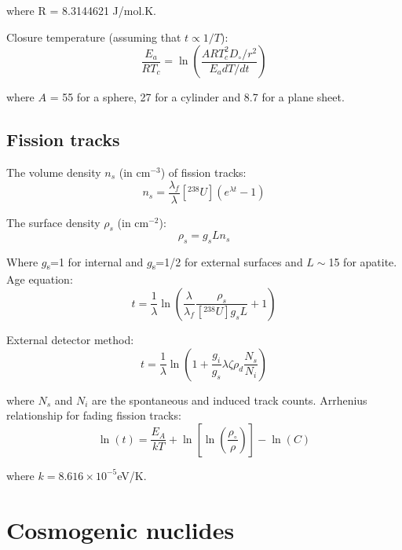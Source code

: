 \documentclass{article}
\begin{document}
\begin{multicols}{3}
where R = 8.3144621 J/mol.K.\medskip

Closure temperature (assuming that $t \propto 1/T$):
\begin{equation}
\frac{E_a}{RT_c} = \ln\left(\frac{ART_c^2D_\circ/r^2}{E_adT/dt}\right)
\label{eq:Tc}
\end{equation}

where $A$ = 55 for a sphere, 27 for a cylinder and 8.7 for a plane
sheet.

\subsection{Fission tracks}
\label{sec:fission-tracks}

The volume density $n_s$ (in cm$^{-3}$) of fission tracks:
\begin{equation}
n_{s} = \frac{\lambda_f}{\lambda} [^{238}U] \left(e^{\lambda t}-1\right)
\label{eq:Ns}
\end{equation}

The surface density $\rho_s$ (in cm$^{-2}$):
\begin{equation}
\rho_s = g_s L n_s
\label{eq:rhos}
\end{equation}

Where $g$\textsubscript{s}=1 for internal and $g$\textsubscript{s}=1/2
for external surfaces and $L\sim$15 for apatite. Age
equation:
\begin{equation}
t = \frac{1}{\lambda}
\ln\left(\frac{\lambda}{\lambda_f}\frac{\rho_s}{[^{238}U] g_s L
}+1\right)
\label{eq:tFT}
\end{equation}

External detector method:
\begin{equation}
t =
\frac{1}{\lambda}\ln\left(1+\frac{g_i}{g_s}\lambda\zeta\rho_d\frac{N_s}{N_i}\right)
\label{eq:tzeta}
\end{equation}

\noindent where $N_s$ and $N_i$ are the spontaneous and induced track
counts. Arrhenius relationship for fading fission tracks:
\begin{equation}
\ln(t) = \frac{E_A}{kT} +
\ln\left[\ln\left(\frac{\rho_\circ}{\rho}\right)\right] - \ln(C)
\label{eq:lnt}
\end{equation}

where $k=8.616\times{10}^{-5}$eV/K.

\section[Cosmogenic Nuclides]{Cosmogenic nuclides}
\label{sec:cosmo}


\end{multicols}
\end{document}
